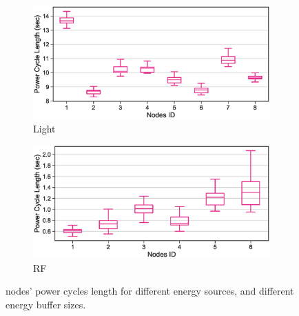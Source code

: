 \begin{figure}[t]
		
		\begin{subfigure}{.49\columnwidth}
			\centering
			\includegraphics[width=\textwidth]{figures/light_power_cycles_len}
			\caption{Light}
		\end{subfigure}\hfill
		\begin{subfigure}{.49\columnwidth}
			\centering
			\includegraphics[width=\textwidth]{figures/rf_power_cycles_len}
			\caption{RF}
		\end{subfigure}\hfill
		\caption{nodes' power cycles length for different energy sources, and different energy buffer sizes.}
		\label{fig:power_cycles}
\end{figure} 


